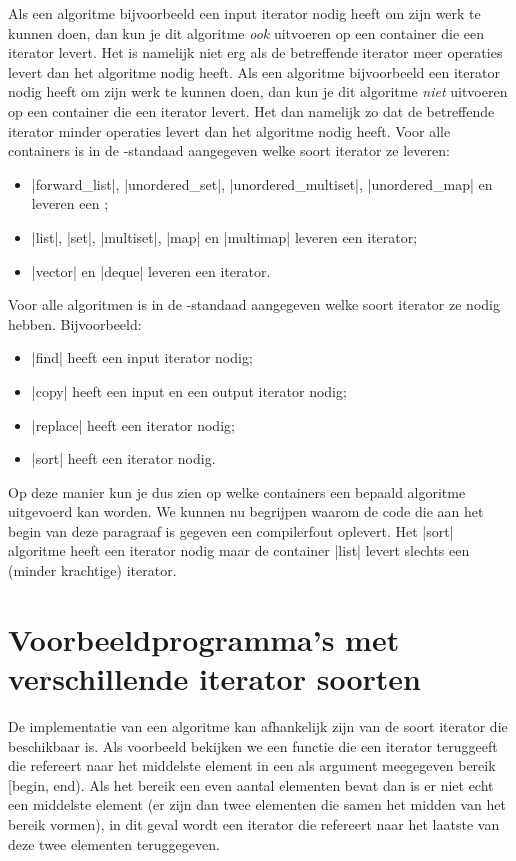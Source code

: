 \begin{cpplstShortInline}
Als een algoritme bijvoorbeeld een input iterator nodig heeft om zijn werk te kunnen doen, dan kun je dit algoritme \emph{ook} uitvoeren op een container die een  iterator levert.
Het is namelijk niet erg als de betreffende iterator meer operaties levert dan het algoritme nodig heeft.
Als een algoritme bijvoorbeeld een  iterator nodig heeft om zijn werk te kunnen doen, dan kun je dit algoritme \emph{niet} uitvoeren op een container die een  iterator levert.
Het dan namelijk zo dat de betreffende iterator minder operaties levert dan het algoritme nodig heeft.
Voor alle containers is in de \Cpp{}\hyp{}standaad aangegeven welke soort iterator ze leveren:
\begin{itemize}
	\item |forward_list|, |unordered_set|, |unordered_multiset|, |unordered_map| en  leveren een ;
	\item |list|, |set|, |multiset|, |map| en |multimap| leveren een  iterator;
	\item |vector| en |deque| leveren een  iterator.
\end{itemize}
Voor alle algoritmen is in de \Cpp{}\hyp{}standaad aangegeven welke soort iterator ze nodig hebben.
Bijvoorbeeld:
\begin{itemize}
	\item |find| heeft een input iterator nodig;
	\item |copy| heeft een input en een output iterator nodig;
	\item |replace| heeft een  iterator nodig;
	\item |sort| heeft een  iterator nodig.
\end{itemize}
Op deze manier kun je dus zien op welke containers een bepaald algoritme uitgevoerd kan worden.
We kunnen nu begrijpen waarom de code die aan het begin van deze paragraaf is gegeven een compilerfout oplevert.
Het |sort| algoritme heeft een  iterator nodig maar de container |list| levert slechts een (minder krachtige)  iterator.

\section{Voorbeeldprogramma's met verschillende iterator soorten}
\label{sec:vbverschillendeiteratorsoorten}
De implementatie van een algoritme kan afhankelijk zijn van de soort iterator die beschikbaar is.
Als voorbeeld bekijken we een functie die een iterator teruggeeft die refereert naar het middelste element in een als argument meegegeven bereik [begin, end).
Als het bereik een even aantal elementen bevat dan is er niet echt een middelste element (er zijn dan twee elementen die samen het midden van het bereik vormen), in dit geval wordt een iterator die refereert naar het laatste van deze twee elementen teruggegeven.


\end{cpplstShortInline}
